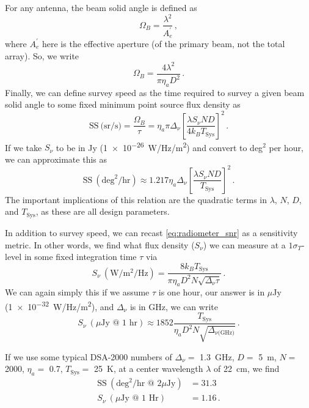 For any antenna, the beam solid angle is defined as
\begin{equation}
    \Omega_B = \frac{\lambda^2}{A_e^\prime}\,,
\end{equation}
where $A_e^\prime$ here is the effective aperture (of the primary beam, not the total array).
So, we write
\begin{equation}
    \Omega_B = \frac{4\lambda^2}{\pi\eta_aD^2}\,.
\end{equation}
Finally, we can define survey speed as the time required to survey a given beam solid angle to some fixed minimum point source flux density as
\begin{equation}
    \text{SS}~\text{(sr/s)} = \frac{\Omega_B}{\tau} = \eta_a\pi\Delta_\nu\left[\frac{\lambda S_\nu N D}{4k_B T_\text{Sys}}\right]^2\,.
\end{equation}
If we take $S_\nu$ to be in Jy (\qty{1e-26}{\W/\Hz/\m^2}) and convert to deg$^2$ per hour, we can approximate this as
\begin{equation}
        \text{SS}~(\text{deg}^2/\text{hr}) \approx 1.217\eta_a\Delta_\nu\left[\frac{\lambda S_\nu N D}{T_\text{Sys}}\right]^2\,.
\end{equation}
The important implications of this relation are the quadratic terms in $\lambda$, $N$, $D$, and $T_\text{Sys}$, as these are all design parameters.

In addition to survey speed, we can recast \autoref{eq:radiometer_snr} as a sensitivity metric.
In other words, we find what flux density ($S_\nu$) we can measure at a $1\sigma_T$-level in some fixed integration time $\tau$ via
\begin{equation}
    S_\nu~(\text{W}/\text{m}^2/\text{Hz}) = \frac{8k_BT_\text{Sys}}{\pi\eta_aD^2N\sqrt{\Delta_\nu\tau}}\,.
\end{equation}
We can again simply this if we assume $\tau$ is one hour, our answer is in $\mu$Jy (\qty{1e-32}{\W/\Hz/\m^2}), and $\Delta_\nu$ is in GHz, we can write
\begin{equation}
    S_\nu~(\mu\text{Jy @ 1 hr}) \approx 1852\frac{T_\text{Sys}}{\eta_aD^2N\sqrt{\Delta_{\nu\text{(GHz)}}}}\,.
\end{equation}

If we use some typical DSA-2000 numbers of $\Delta_\nu=$ \qty{1.3}{\GHz}, $D=$ \qty{5}{\m}, $N=$ \num{2000}, $\eta_a=$ \num{0.7}, $T_\text{Sys}=$ \qty{25}{\K}, at a center wavelength $\lambda$ of \qty{22}{\cm}, we find
\begin{align}
    \text{SS}~(\text{deg}^2/\text{hr @ 2}\mu\text{Jy}) &= 31.3 \\
    S_\nu~(\mu\text{Jy @ 1 Hr}) &= 1.16\,.
\end{align}

